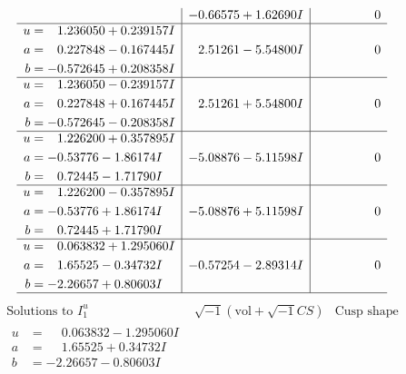 \documentclass[1p]{elsarticle_modified}
\theoremstyle{definition}
\newcommand{\I}{\sqrt{-1}}
\begin{document}
$$\begin{array}{c|c|c}
 & -0.66575 + 1.62690 I & \phantom{-0.000000 } 0 \\ \hline\begin{aligned}
u &= \phantom{-}1.236050 + 0.239157 I \\
a &= \phantom{-}0.227848 - 0.167445 I \\
b &= -0.572645 + 0.208358 I\end{aligned}
 & \phantom{-}2.51261 - 5.54800 I & \phantom{-0.000000 } 0 \\ \hline\begin{aligned}
u &= \phantom{-}1.236050 - 0.239157 I \\
a &= \phantom{-}0.227848 + 0.167445 I \\
b &= -0.572645 - 0.208358 I\end{aligned}
 & \phantom{-}2.51261 + 5.54800 I & \phantom{-0.000000 } 0 \\ \hline\begin{aligned}
u &= \phantom{-}1.226200 + 0.357895 I \\
a &= -0.53776 - 1.86174 I \\
b &= \phantom{-}0.72445 - 1.71790 I\end{aligned}
 & -5.08876 - 5.11598 I & \phantom{-0.000000 } 0 \\ \hline\begin{aligned}
u &= \phantom{-}1.226200 - 0.357895 I \\
a &= -0.53776 + 1.86174 I \\
b &= \phantom{-}0.72445 + 1.71790 I\end{aligned}
 & -5.08876 + 5.11598 I & \phantom{-0.000000 } 0 \\ \hline\begin{aligned}
u &= \phantom{-}0.063832 + 1.295060 I \\
a &= \phantom{-}1.65525 - 0.34732 I \\
b &= -2.26657 + 0.80603 I\end{aligned}
 & -0.57254 - 2.89314 I & \phantom{-0.000000 } 0\\
 \hline 
 \end{array}$$\newpage$$\begin{array}{c|c|c}  
\text{Solutions to }I^u_{1}& \I (\text{vol} + \sqrt{-1}CS) & \text{Cusp shape}\\
 \hline 
\begin{aligned}
u &= \phantom{-}0.063832 - 1.295060 I \\
a &= \phantom{-}1.65525 + 0.34732 I \\
b &= -2.26657 - 0.80603 I\end{aligned}

\end{array}$$
\end{document}
